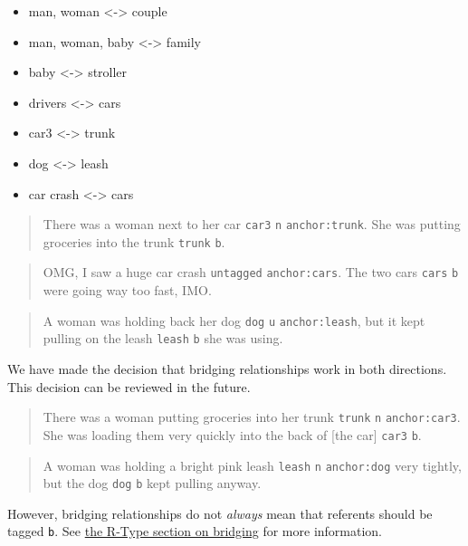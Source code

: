 \documentclass[
]{book}
\providecommand{\tightlist}{%
  \setlength{\itemsep}{0pt}\setlength{\parskip}{0pt}}
\begin{document}
\begin{itemize}
\tightlist
\item
  man, woman \textless-\textgreater{} couple
\item
  man, woman, baby \textless-\textgreater{} family
\item
  baby \textless-\textgreater{} stroller
\item
  drivers \textless-\textgreater{} cars
\item
  car3 \textless-\textgreater{} trunk
\item
  dog \textless-\textgreater{} leash
\item
  car crash \textless-\textgreater{} cars
\end{itemize}

\begin{quote}
There was a woman next to her car \texttt{car3} \texttt{n} \texttt{anchor:trunk}.
She was putting groceries into the trunk \texttt{trunk} \texttt{b}.
\end{quote}

\begin{quote}
OMG, I saw a huge car crash \texttt{untagged} \texttt{anchor:cars}.
The two cars \texttt{cars} \texttt{b} were going way too fast, IMO.
\end{quote}

\begin{quote}
A woman was holding back her dog \texttt{dog} \texttt{u} \texttt{anchor:leash},
but it kept pulling on the leash \texttt{leash} \texttt{b} she was using.
\end{quote}

We have made the decision that bridging relationships work in both directions.
This decision can be reviewed in the future.

\begin{quote}
There was a woman putting groceries into her trunk \texttt{trunk} \texttt{n} \texttt{anchor:car3}.
She was loading them very quickly into the back of {[}the car{]} \texttt{car3} \texttt{b}.
\end{quote}

\begin{quote}
A woman was holding a bright pink leash \texttt{leash} \texttt{n} \texttt{anchor:dog} very tightly,
but the dog \texttt{dog} \texttt{b} kept pulling anyway.
\end{quote}

However, bridging relationships do not \emph{always} mean that
referents should be tagged \texttt{b}.
See \protect\hyperlink{bridging}{the R-Type section on bridging} for more information.
\end{document}
